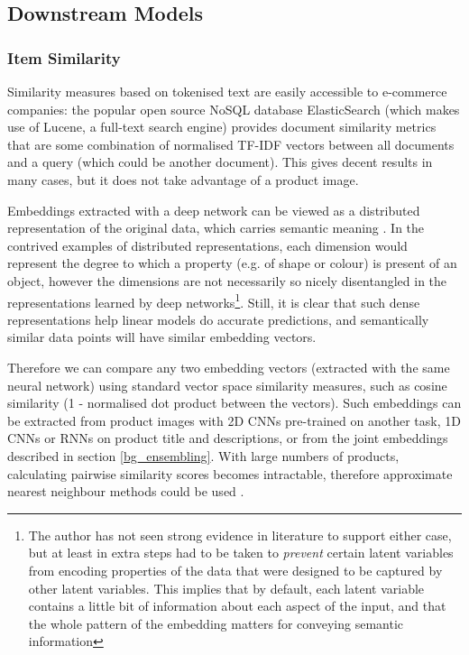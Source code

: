 \subsection{Downstream Models}

\subsubsection{Item Similarity}
\label{bg_sim}

Similarity measures based on tokenised text are easily accessible to e-commerce companies: the popular open source NoSQL database ElasticSearch (which makes use of Lucene, a full-text search engine) provides document similarity metrics that are some combination of normalised TF-IDF vectors between all documents and a query (which could be another document).
This gives decent results in many cases, but it does not take advantage of a product image.

Embeddings extracted with a deep network can be viewed as a distributed representation of the original data, which carries semantic meaning \cite{distributed_reps}.
In the contrived examples of distributed representations, each dimension would represent the degree to which a property (e.g. of shape or colour) is present of an object, however the dimensions are not necessarily so nicely disentangled in the representations learned by deep networks\footnote{The author has not seen strong evidence in literature to support either case, but at least in \cite{towards} extra steps had to be taken to \textit{prevent} certain latent variables from encoding properties of the data that were designed to be captured by other latent variables. This implies that by default, each latent variable contains a little bit of information about each aspect of the input, and that the whole pattern of the embedding matters for conveying semantic information}.
Still, it is clear that such dense representations help linear models do accurate predictions, and semantically similar data points will have similar embedding vectors.

Therefore we can compare any two embedding vectors (extracted with the same neural network) using standard vector space similarity measures, such as cosine similarity (1 - normalised dot product between the vectors).
Such embeddings can be extracted from product images with 2D CNNs pre-trained on another task, 1D CNNs or RNNs on product title and descriptions, or from the joint embeddings described in section \ref{bg_ensembling}.
With large numbers of products, calculating pairwise similarity scores becomes intractable, therefore approximate nearest neighbour methods could be used \cite{nmslib}.

